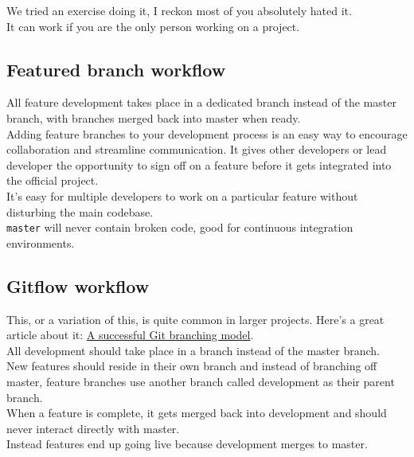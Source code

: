We tried an exercise doing it, I reckon most of you absolutely hated it. 
\\

It can work if you are the only person working on a project. 


\subsection{Featured branch workflow}

All feature development takes place in a dedicated branch instead of the master branch, with branches merged back into master when ready.
\\

Adding feature branches to your development process is an easy way to encourage collaboration and streamline communication. It gives other developers or lead developer the opportunity to sign off on a feature before it gets integrated into the official project.
\\

It's easy for multiple developers to work on a particular feature without disturbing the main codebase.
\\

\texttt{master} will never contain broken code, good for continuous integration environments.


\subsection{Gitflow workflow}

This, or a variation of this, is quite common in larger projects. Here's a great article about it: \href{https://nvie.com/posts/a-successful-git-branching-model/}{A successful Git branching model}.
\\

All development should take place in a branch instead of the master branch.
\\

New features should reside in their own branch and instead of branching off master, feature branches use another branch called development as their parent branch.
\\

When a feature is complete, it gets merged back into development and should never interact directly with master.
\\

Instead features end up going live because development merges to master.

